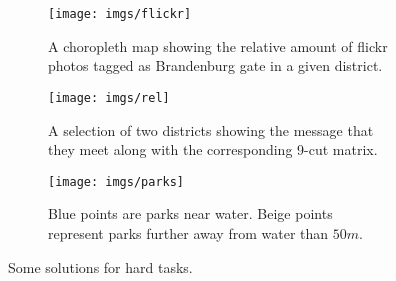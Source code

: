 \begin{figure*}[t]
		\centering
		\begin{subfigure}[b]{0.3\textwidth}
                \centering
                \texttt{[image: imgs/flickr]}
                \caption{A choropleth map showing the relative amount of flickr photos tagged
                as Brandenburg gate in a given district.}
                \label{fig:flickr}
        \end{subfigure}
        \hspace*{0.02\textwidth}
        \begin{subfigure}[b]{0.3\textwidth}
				\centering
				\texttt{[image: imgs/rel]}
				\caption{A selection of two districts showing the message that
				they meet along with the corresponding 9-cut matrix.}
				\label{fig:rel}
		\end{subfigure}
		\hspace*{0.02\textwidth}
        \begin{subfigure}[b]{0.3\textwidth}
                \centering
                \texttt{[image: imgs/parks]}
                \caption{Blue points are parks near water. Beige points represent parks further
                away from water than $50m$.}
                \label{fig:parks}
        \end{subfigure}
        \caption{Some solutions for hard tasks.}
\end{figure*}
